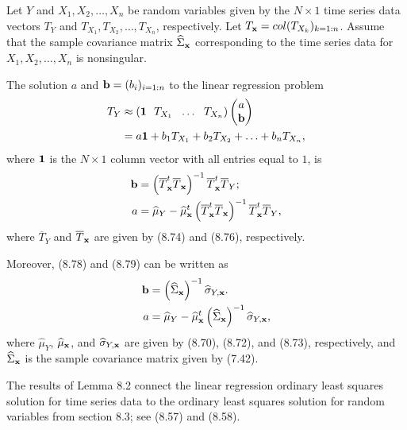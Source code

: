 \begin{lemma}
Let $Y$ and $X_1, X_2, \ldots, X_n$ be random variables given by the $N\times1$ time
series data vectors $T_Y$ and $T_{X_1}, T_{X_2}, \ldots, T_{X_n}$, respectively. Let
$T_{\mathbf{x}} = col(T_{X_k})_{k=1:n}$. Assume that the sample covariance matrix
$\widehat\Sigma_{\mathbf{x}}$ corresponding to the time series data for $X_1, X_2, \ldots,
X_n$ is nonsingular.

The solution $a$ and $\mathbf{b} = (b_i)_{i=1:n}$ to the linear regression problem
\begin{align}
T_Y &\approx (\mathbf{1}\ \ T_{X_1}\ \ \ldots\ \ T_{X_n})\begin{pmatrix} a \\ \mathbf{b}
\end{pmatrix}\\
&= a\mathbf{1} + b_1T_{X_1} + b_2T_{X_2} + \ldots + b_nT_{X_n}, \notag
\end{align}
where $\mathbf{1}$ is the $N\times1$ column vector with all entries equal to $1$, is
\begin{align}
\mathbf{b} &= \left(\overline{T}_{\mathbf{x}}^t\overline{T}_{\mathbf{x}}\right)^{-1}\overline{T}_{\mathbf{x}}^t
\overline{T}_Y;\\
a &= \widehat\mu_Y - \widehat\mu_{\mathbf{x}}^t\left(\overline{T}_{\mathbf{x}}^t
\overline{T}_{\mathbf{x}}\right)^{-1}\overline{T}_{\mathbf{x}}^t\overline{T}_Y,
\end{align}
where $\overline{T}_Y$ and $\overline{T}_{\mathbf{x}}$ are given by (8.74) and (8.76),
respectively.

Moreover, (8.78) and (8.79) can be written as
\begin{align}
\mathbf{b} &= \left(\widehat\Sigma_{\mathbf{x}}\right)^{-1}\widehat\sigma_{Y,\mathbf{x}}.\\
a &= \widehat\mu_Y - \widehat\mu_{\mathbf{x}}^t\left(\widehat\Sigma_{\mathbf{x}}\right)^{-1}
\widehat\sigma_{Y,\mathbf{x}},
\end{align}
where $\widehat\mu_Y$, $\widehat\mu_{\mathbf{x}}$, and $\widehat\sigma_{Y,\mathbf{x}}$ are given by
(8.70), (8.72), and (8.73), respectively, and $\widehat\Sigma_{\mathbf{x}}$ is the sample
covariance matrix given by (7.42).
\end{lemma}

The results of Lemma 8.2 connect the linear regression ordinary least squares solution
for time series data to the ordinary least squares solution for random variables from
section 8.3; see (8.57) and (8.58).

